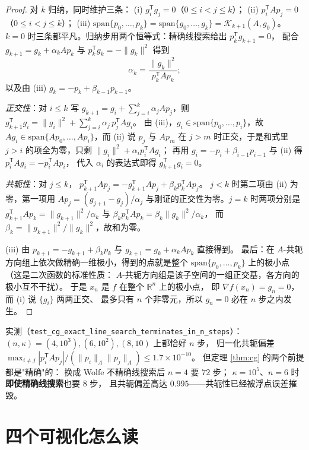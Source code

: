 \begin{proof}
对 $k$ 归纳，同时维护三条：
(i) $g_i^{\mathsf T}g_j=0$（$0\le i<j\le k$）；
(ii) $p_i^{\mathsf T}Ap_j=0$（$0\le i<j\le k$）；
(iii) $\mathrm{span}\{p_0,\dots,p_k\}=\mathrm{span}\{g_0,\dots,g_k\}
=\mathcal K_{k+1}(A,g_0)$。
$k=0$ 时三条都平凡。归纳步用两个恒等式：精确线搜索给出 $p_k^{\mathsf T}g_{k+1}=0$，
配合 $g_{k+1}=g_k+\alpha_kAp_k$ 与 $p_k^{\mathsf T}g_k=-\|g_k\|^2$ 得到
\[
  \alpha_k=\frac{\|g_k\|^2}{p_k^{\mathsf T}Ap_k};
\]
以及由 (iii) $g_k=-p_k+\beta_{k-1}p_{k-1}$。

\emph{正交性}：对 $i\le k$ 写 $g_{k+1}=g_i+\sum_{j=i}^{k}\alpha_jAp_j$，则
$g_{k+1}^{\mathsf T}g_i=\|g_i\|^2+\sum_{j=i}^{k}\alpha_j\,p_j^{\mathsf T}Ag_i$。
由 (iii)，$g_i\in\mathrm{span}\{p_0,\dots,p_i\}$，故
$Ag_i\in\mathrm{span}\{Ap_0,\dots,Ap_i\}$，而 (ii) 说 $p_j$ 与 $Ap_m$
在 $j>m$ 时正交，于是和式里 $j>i$ 的项全为零，只剩
$\|g_i\|^2+\alpha_ip_i^{\mathsf T}Ag_i$；
再用 $g_i=-p_i+\beta_{i-1}p_{i-1}$ 与 (ii) 得 $p_i^{\mathsf T}Ag_i=-p_i^{\mathsf T}Ap_i$，
代入 $\alpha_i$ 的表达式即得 $g_{k+1}^{\mathsf T}g_i=0$。

\emph{共轭性}：对 $j\le k$，
$p_{k+1}^{\mathsf T}Ap_j=-g_{k+1}^{\mathsf T}Ap_j+\beta_kp_k^{\mathsf T}Ap_j$。
$j<k$ 时第二项由 (ii) 为零，第一项用 $Ap_j=(g_{j+1}-g_j)/\alpha_j$
与刚证的正交性为零。$j=k$ 时两项分别是
$g_{k+1}^{\mathsf T}Ap_k=\|g_{k+1}\|^2/\alpha_k$ 与
$\beta_kp_k^{\mathsf T}Ap_k=\beta_k\|g_k\|^2/\alpha_k$，
而 $\beta_k=\|g_{k+1}\|^2/\|g_k\|^2$，故和为零。

(iii) 由 $p_{k+1}=-g_{k+1}+\beta_kp_k$ 与 $g_{k+1}=g_k+\alpha_kAp_k$ 直接得到。
最后：在 $A$-共轭方向组上依次做精确一维极小，得到的点就是整个
$\mathrm{span}\{p_0,\dots,p_k\}$ 上的极小点（这是二次函数的标准性质：
$A$-共轭方向组是该子空间的一组正交基，各方向的极小互不干扰）。
于是 $x_n$ 是 $f$ 在整个 $\mathbb R^n$ 上的极小点，
即 $\nabla f(x_n)=g_n=0$，而 (i) 说 $\{g_i\}$ 两两正交、
最多只有 $n$ 个非零元，所以 $g_n=0$ 必在 $n$ 步之内发生。
\end{proof}

实测（\texttt{test\_cg\_exact\_line\_search\_terminates\_in\_n\_steps}）：
$(n,\kappa)=(4,10^3),(6,10^2),(8,10)$ 上都恰好 $n$ 步，
归一化共轭偏差 $\max_{i\ne j}|p_i^{\mathsf T}Ap_j|/(\|p_i\|_A\|p_j\|_A)\le1.7\times10^{-10}$。
但定理 \ref{thm:cg} 的两个前提都是"精确"的：
换成 Wolfe 不精确线搜索后 $n=4$ 要 $72$ 步；
$\kappa=10^5$、$n=6$ 时\textbf{即使精确线搜索}也要 $8$ 步，
且共轭偏差高达 $0.995$——共轭性已经被浮点误差摧毁。

\section{四个可视化怎么读}

